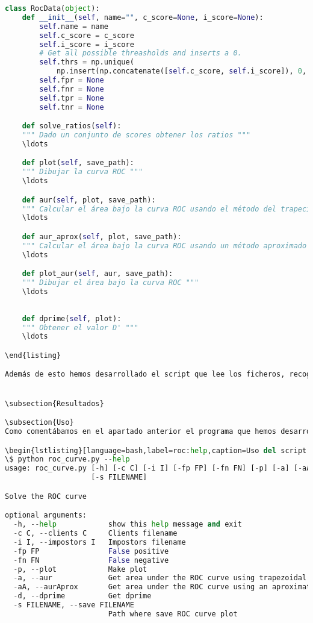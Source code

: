 \begin{lstlisting}[language=python,label=roc:rocdata,caption=EDA con la que gestionar la curva ROC]
class RocData(object):
    def __init__(self, name="", c_score=None, i_score=None):
        self.name = name
        self.c_score = c_score
        self.i_score = i_score
        # Get all possible threasholds and inserts a 0.
        self.thrs = np.unique(
            np.insert(np.concatenate([self.c_score, self.i_score]), 0, 0))
        self.fpr = None
        self.fnr = None
        self.tpr = None
        self.tnr = None

    def solve_ratios(self):
    """ Dado un conjunto de scores obtener los ratios """
    \ldots 

    def plot(self, save_path):
    """ Dibujar la curva ROC """
    \ldots

    def aur(self, plot, save_path):
    """ Calcular el área bajo la curva ROC usando el método del trapecio """
    \ldots

    def aur_aprox(self, plot, save_path):
    """ Calcular el área bajo la curva ROC usando un método aproximado """
    \ldots

    def plot_aur(self, aur, save_path):
    """ Dibujar el área bajo la curva ROC """
    \ldots
    
    
    def dprime(self, plot):
    """ Obtener el valor D' """
    \ldots

\end{listing}

Además de esto hemos desarrollado el script que lee los ficheros, recoge los argumentos y llama a las disntintas funciones para resolver la curva ROC. 


\subsection{Resultados}

\subsection{Uso}
Como comentábamos en el apartado anterior el programa que hemos desarrollado es un script de consola con las opciones que podemos ver en la sección de código \ref{roc:help}

\begin{lstlisting}[language=bash,label=roc:help,caption=Uso del script para calcular la curva ROC]
\$ python roc_curve.py --help
usage: roc_curve.py [-h] [-c C] [-i I] [-fp FP] [-fn FN] [-p] [-a] [-aA] [-d]
                    [-s FILENAME]

Solve the ROC curve

optional arguments:
  -h, --help            show this help message and exit
  -c C, --clients C     Clients filename
  -i I, --impostors I   Impostors filename
  -fp FP                False positive
  -fn FN                False negative
  -p, --plot            Make plot
  -a, --aur             Get area under the ROC curve using trapezoidal rule
  -aA, --aurAprox       Get area under the ROC curve using an aproximation
  -d, --dprime          Get dprime
  -s FILENAME, --save FILENAME
                        Path where save ROC curve plot
\end{lstlisting}

